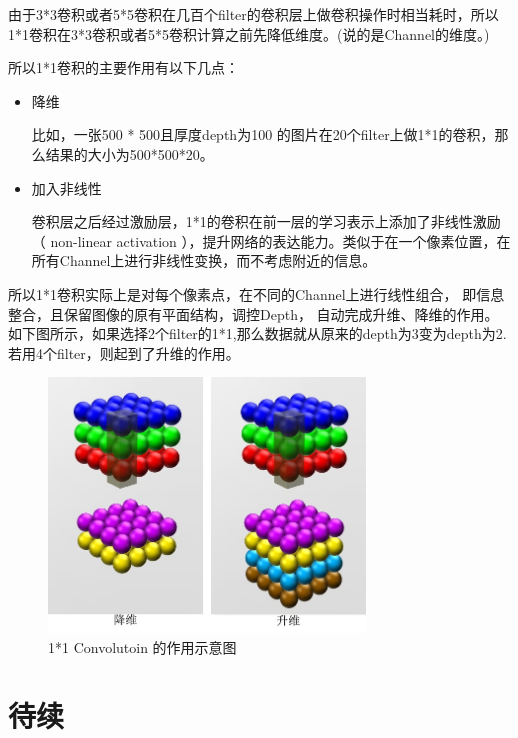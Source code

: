 由于3*3卷积或者5*5卷积在几百个filter的卷积层上做卷积操作时相当耗时，所以1*1卷积在3*3卷积或者5*5卷积计算之前先降低维度。(说的是Channel的维度。)

所以1*1卷积的主要作用有以下几点：
\begin{itemize}
\item 降维

比如，一张500 * 500且厚度depth为100 的图片在20个filter上做1*1的卷积，那么结果的大小为500*500*20。

\item 加入非线性

卷积层之后经过激励层，1*1的卷积在前一层的学习表示上添加了非线性激励（ non-linear activation ），提升网络的表达能力。类似于在一个像素位置，在所有Channel上进行非线性变换，而不考虑附近的信息。

\end{itemize}

所以1*1卷积实际上是对每个像素点，在不同的Channel上进行线性组合， 即信息整合，且保留图像的原有平面结构，调控Depth， 自动完成升维、降维的作用。如下图所示，如果选择2个filter的1*1,那么数据就从原来的depth为3变为depth为2.若用4个filter，则起到了升维的作用。
\begin{figure}[!hbtp]
\centering
\includegraphics[width=0.75\textwidth]{DLTips/OneOneConv0.jpg}
\caption{1*1 Convolutoin 的作用示意图}
\label{OneOneConv0}
\end{figure}


\section{待续}













